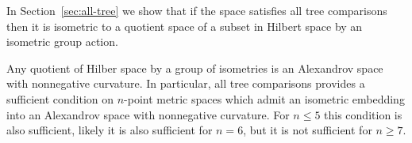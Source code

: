 In Section~\ref{sec:all-tree} we show that if the space satisfies all tree comparisons then it is isometric to a quotient space of a subset in Hilbert space by an isometric group action.

Any quotient of Hilber space by a group of isometries is an Alexandrov space with nonnegative curvature.
In particular, all tree comparisons provides a sufficient condition on $n$-point metric spaces which admit an isometric embedding into an Alexandrov space with nonnegative curvature.
For $n\le 5$ this condition is also sufficient, likely it is also sufficient for $n=6$, but it is not sufficient for $n\ge 7$.
